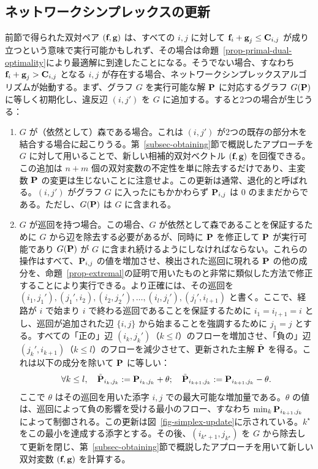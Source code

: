 \subsection{ネットワークシンプレックスの更新}
前節で得られた双対ペア $(\fD,\gD)$ は、すべての $i,j$ に対して $\fD_i+\gD_j\leq \C_{i,j}$ が成り立つという意味で実行可能かもしれず、その場合は命題~\ref{prop-primal-dual-optimality}により最適解に到達したことになる。そうでない場合、すなわち $\fD_i+\gD_j> \C_{i,j}$ となる $i,j$ が存在する場合、ネットワークシンプレックスアルゴリズムが始動する。まず、グラフ $G$ を実行可能な解 $\P$ に対応するグラフ $G(\P)$ に等しく初期化し、違反辺 $(i,j')$ を $G$ に追加する。すると2つの場合が生じうる：
\begin{enumerate}[label={(\alph*)}]
	\item $G$ が（依然として）森である場合。これは $(i,j')$ が2つの既存の部分木を結合する場合に起こりうる。第~\ref{subsec-obtaining}節で概説したアプローチを $G$ に対して用いることで、新しい相補的双対ベクトル $(\fD,\gD)$ を回復できる。この追加は $n+m$ 個の双対変数の不定性を単に除去するだけであり、主変数 $\P$ の変更は生じないことに注意せよ。この更新は通常、退化的と呼ばれる。$(i,j')$ がグラフ $G$ に入ったにもかかわらず $\P_{i,j}$ は $0$ のままだからである。ただし、$G(\P)$ は $G$ に含まれる。

	\item $G$ が巡回を持つ場合。この場合、$G$ が依然として森であることを保証するために $G$ から辺を除去する必要があるが、同時に $\P$ を修正して $\P$ が実行可能であり $G(\P)$ が $G$ に含まれ続けるようにしなければならない。これらの操作はすべて、$\P_{i,j}$ の値を増加させ、検出された巡回に現れる $\P$ の他の成分を、命題~\ref{prop-extremal}の証明で用いたものと非常に類似した方法で修正することにより実行できる。より正確には、その巡回を $(i_1,j_1'), (j_1',i_2), (i_2,j_2'),\dots, (i_l,j_l'),(j_l',i_{l+1})$ と書く。ここで、経路が $i$ で始まり $i$ で終わる巡回であることを保証するために $i_1=i_{l+1}=i$ とし、巡回が追加された辺 $\{i,j\}$ から始まることを強調するために $j_1=j$ とする。すべての「正の」辺 $(i_k,j_k')$（$k\leq l$）のフローを増加させ、「負の」辺 $(j_k',i_{k+1})$（$k\leq l$）のフローを減少させて、更新された主解 $\tilde{\P}$ を得る。これは以下の成分を除いて $\P$ に等しい：
$$\forall k\leq l,\quad \tilde{\P}_{i_k,j_k}:= \P_{i_k,j_k}+\theta;\quad \tilde{\P}_{i_{k+1},j_k}:= \P_{i_{k+1},j_k}-\theta.$$
ここで $\theta$ はその巡回を用いた添字 $i,j$ での最大可能な増加量である。$\theta$ の値は、巡回によって負の影響を受ける最小のフロー、すなわち $\min_{k} \P_{i_{k+1},j_k}$ によって制御される。この更新は図~\ref{fig-simplex-update}に示されている。$k^\star$ をこの最小を達成する添字とする。その後、$(i_{k^\star+1},j_{k^\star})$ を $G$ から除去して更新を閉じ、第~\ref{subsec-obtaining}節で概説したアプローチを用いて新しい双対変数 $(\fD,\gD)$ を計算する。
\end{enumerate}

